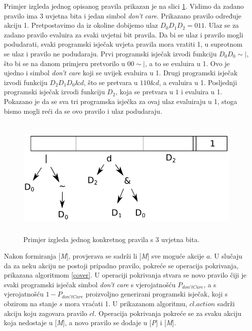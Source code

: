 \documentclass[times, utf8, zavrsni]{fer}
\begin{document}
Primjer izgleda jednog opisanog pravila prikazan je na slici \ref{img:clex}.
Vidimo da zadano pravilo ima 3 uvjetna bita i jedan simbol \emph{don't care}.
Prikazano pravilo određuje akciju 1.
Pretpostavimo da iz okoline dobijemo ulaz $D_{0}D_{1}D_{2} = 011$.
Ulaz se za zadano pravilo evaluira za svaki uvjetni bit pravila.
Da bi se ulaz i pravilo mogli podudarati, svaki programski isječak uvjeta pravila mora vratiti 1, u suprotnom se ulaz i pravilo ne podudaraju.
Prvi programski isječak izvodi funkciju $D_{0}D_{0}\sim|$, što bi se na danom primjeru pretvorilo u $00\sim|$, a to se evaluira u 1.
Ovo je ujedno i simbol \emph{don't care} koji se uvijek evaluira u 1.
Drugi programski isječak izvodi funkciju $D_{2}D_{1}D_{0}\&d$, što se pretvara u $110\&d$, a evaluira u 1.
Posljednji programski isječak izvodi funkciju $D_{2}$, koja se pretvara u $1$ i evaluira u 1.
Pokazano je da se sva tri programska isječka za ovaj ulaz evaluiraju u 1, stoga bismo mogli reći da se ovo pravilo i ulaz podudaraju.
\begin{figure}[h]
    \centering
    \includegraphics[height=6cm]{img/clex.pdf}
    \caption{Primjer izgleda jednog konkretnog pravila s 3 uvjetna bita.}
    \label{img:clex}
\end{figure}

Nakon formiranja [\emph{M}], provjerava se sadrži li [\emph{M}] sve moguće akcije $a$.
U slučaju da za neku akciju ne postoji pripadno pravilo, pokreće se operacija pokrivanja, prikazana algoritmom \ref{cover}.
U operaciji pokrivanja stvara se novo pravilo čiji je svaki programski isječak simbol \emph{don't care} s vjerojatnošću $P_{don'tCare}$, a s vjerojatnošću $1 - P_{don'tCare}$ proizvoljno generirani programski isječak, koji s obzirom na stanje $s$ mora vraćati 1.
U prikazanom algoritmu, $cl.action$ sadrži akciju koju zagovara pravilo $cl$.
Operacija pokrivanja pokreće se za svaku akciju koja nedostaje u [\emph{M}], a novo pravilo se dodaje u [\emph{P}] i [\emph{M}].
\end{document}
